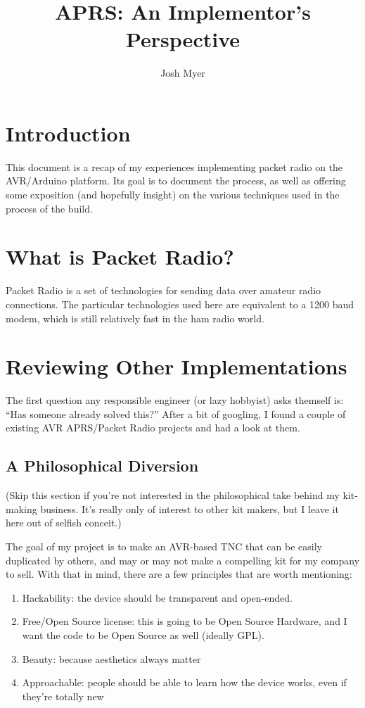 \documentclass{article}
\title{APRS: An Implementor's Perspective}
\author{Josh Myer}
\begin{document}
\newcommand{\aprs}{APRS\texttrademark}



\maketitle


\section{Introduction}
This document is a recap of my experiences implementing packet radio
on the AVR/Arduino platform.  Its goal is to document the process, as
well as offering some exposition (and hopefully insight) on the
various techniques used in the process of the build.


\section{What is Packet Radio?}

Packet Radio is a set of technologies for sending data over amateur
radio connections.  The particular technologies used here are
equivalent to a 1200 baud modem, which is still relatively fast in the
ham radio world.

\section{Reviewing Other Implementations}

The first question any responsible engineer (or lazy hobbyist) asks
themself is: ``Has someone already solved this?''  After a bit of
googling, I found a couple of existing AVR \aprs /Packet Radio
projects and had a look at them.

\subsection{A Philosophical Diversion}

(Skip this section if you're not interested in the philosophical take
behind my kit-making business.  It's really only of interest to other
kit makers, but I leave it here out of selfish conceit.)

The goal of my project is to make an AVR-based TNC that can be easily
duplicated by others, and may or may not make a compelling kit for my
company to sell.  With that in mind, there are a few principles that
are worth mentioning:

\begin{enumerate}
\item Hackability: the device should be transparent and open-ended.
\item Free/Open Source license: this is going to be Open Source Hardware,
  and I want the code to be Open Source as well (ideally GPL).
\item Beauty: because aesthetics always matter
\item Approachable: people should be able to learn how the device
  works, even if they're totally new
\end{enumerate}
\end{document}
